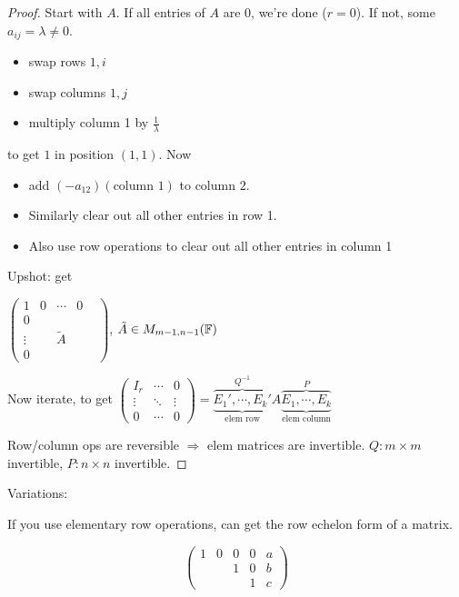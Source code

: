 \documentclass[a4paper]{article}
\begin{document}
\begin{proof}
	Start with $ A $. If all entries of $ A $ are $ 0 $, we're done ($ r = 0 $). If not, some $ a_{ij} = \lambda \neq 0 $.
	\begin{itemize}
		\item swap rows $ 1,i $
		\item swap columns $ 1,j $
		\item multiply column 1 by $ \frac{1}{\lambda} $
		
	\end{itemize}
to get $ 1 $ in position $ (1,1) $. Now

\begin{itemize}
	\item add $ (-a_{12})(\text{column } 1) $ to column $ 2 $. 
	\item Similarly clear out all other entries in row 1.
	\item Also use row operations to clear out all other entries in column 1
\end{itemize}

Upshot: get

$ \begin{pmatrix}
1 & 0 & \cdots & 0 \\
0 & & & &\\
\vdots & & \tilde{A} & \\
0 & & & &
\end{pmatrix} $, $ \tilde{A} \in M_{m-1,n-1}(\mathbb{F}) $

Now iterate, to get $ \begin{pmatrix}
I_{r} & \cdots & 0 \\
\vdots & \ddots & \vdots \\
0 & \cdots & 0  \end{pmatrix} = \overbrace{\underbrace{E_{1}',\cdots,E_{k}'}_{\text{elem row}}}^{Q^{-1}} A \overbrace{\underbrace{E_{1},\cdots,E_{k}}_{\text{elem column}}}^{P}  $


Row/column ops are reversible $ \Rightarrow $ elem matrices are invertible. $ Q: m \times m $ invertible, $ P: n \times n $ invertible.

\end{proof}

Variations:

If you use elementary row operations, can get the row echelon form of a matrix. 

\[ \begin{pmatrix}
1 & 0 & 0 & 0 & a \\
& & 1 & 0 & b\\
& & & 1 & c  
\end{pmatrix} \]
\end{document}
